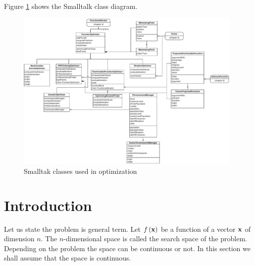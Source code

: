 \documentclass[twoside]{book}
\begin{document}
Figure \ref{fig:soptimizingclasses} shows the Smalltalk class diagram.
\begin{figure}
\centering\includegraphics[width=11cm]{Figures/Optimizing}
\caption{Smalltak classes used in optimization}
\label{fig:soptimizingclasses}
\end{figure}

\section{Introduction}
\label{sec:optimum} Let us state the problem is general term. Let
$f\left({\bf x}\right)$ be a function of a vector ${\bf x}$ of
dimension $n$. The $n$-dimensional space is called the search
space of the problem. Depending on the problem the space can be
continuous or not. In this section we shall assume that the space
is continuous.
\end{document}
